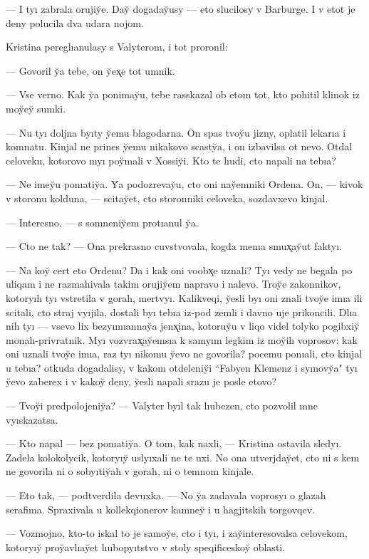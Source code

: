 \documentclass[10pt]{book}
\begin{document}
— I tyı zabrala orujiy̆e. Day̆ dogaday̆usy — eto slucilosy v Barburge. I v etot je deny polucila dva udara nojom.

Kristina pereglıanulasy s Valyterom, i tot proronil:

— Govoril y̆a tebe, on y̆ex̨e tot umnik.

— Vse verno. Kak y̆a ponimay̆u, tebe rasskazal ob etom tot, kto pohitil klinok iz moy̆ey̆ sumki.

— Nu tyı doljna byıty y̆emu blagodarna. On spas tvoy̆u jizny, oplatil lekarıa i komnatu. Kinjal ne prines y̆emu nikakovo scasty̆a, i on izbavilsa ot nevo. Otdal celoveku, kotorovo myı poy̆mali v Xossiy̆i. Kto te lıudi, cto napali na tebıa?

— Ne imey̆u ponıatiy̆a. Y̆a podozrevay̆u, cto oni nay̆emniki Ordena. On, — kivok v storonu kolduna, — scitay̆et, cto storonniki celoveka, sozdavxevo kinjal.

— Interesno, — s somneniy̆em protıanul y̆a.

— Cto ne tak? — Ona prekrasno cuvstvovala, kogda menıa smux̨ay̆ut faktyı.

— Na koy̆ cert eto Ordenu? Da i kak oni voobx̨e uznali? Tyı vedy ne begala po uliqam i ne razmahivala takim orujiy̆em napravo i nalevo. Troy̆e zakonnikov, kotoryıh tyı vstretila v gorah, mertvyı. Kalikveqi, y̆esli byı oni znali tvoy̆e imıa ili scitali, cto straj vyıjila, dostali byı tebıa iz-pod zemli i davno uje prikoncili. Dlıa nih tyı — vsevo lix bezyımıannay̆a jenx̨ina, kotoruy̆u v liqo videl tolyko pogibxiy̆ monah-privratnik. Myı vozvrax̨ay̆emsıa k samyım legkim iz moy̆ih voprosov: kak oni uznali tvoy̆e imıa, raz tyı nikomu y̆evo ne govorila? pocemu ponıali, cto kinjal u tebıa? otkuda dogadalisy, v kakom otdeleniy̆i ``Fabyen Klemenz i syınovy̆a" tyı y̆evo zaberex i v kakoy̆ deny, y̆esli napali srazu je posle etovo?

— Tvoy̆i predpolojeniy̆a? — Valyter byıl tak lıubezen, cto pozvolil mne vyıskazatsa.

— Kto napal — bez ponıatiy̆a. O tom, kak naxli, — Kristina ostavila sledyı. Zadela kolokolycik, kotoryıy̆ uslyıxali ne te uxi. No ona utverjday̆et, cto ni s kem ne govorila ni o sobyıtiy̆ah v gorah, ni o temnom kinjale.

— Eto tak, — podtverdila devuxka. — No y̆a zadavala voprosyı o glazah serafima. Spraxivala u kollekqionerov kamney̆ i u hagjitskih torgovqev.

— Vozmojno, kto-to iskal to je samoy̆e, cto i tyı, i zay̆interesovalsa celovekom, kotoryıy̆ proy̆avlıay̆et lıubopyıtstvo v stoly speqificeskoy̆ oblasti.
\end{document}
